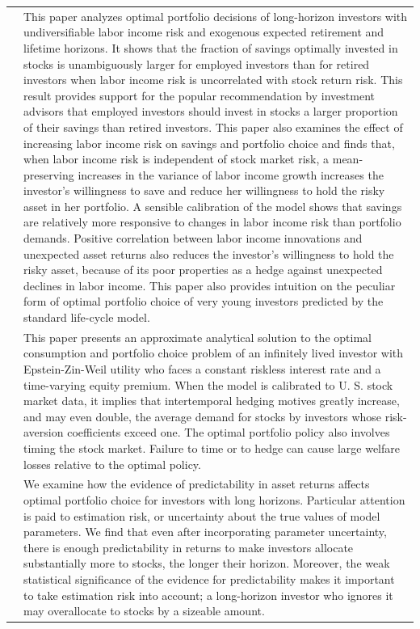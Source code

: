 \documentclass{article}
\begin{document}
\begin{tabular}{p{}p{}}
\cite{Viceira_2001} & This paper analyzes optimal portfolio decisions of long-horizon investors with undiversifiable labor income risk and exogenous expected retirement and lifetime horizons. It shows that the fraction of savings optimally invested in stocks is unambiguously larger for employed investors than for retired investors when labor income risk is uncorrelated with stock return risk. This result provides support for the popular recommendation by investment advisors that employed investors should invest in stocks a larger proportion of their savings than retired investors. This paper also examines the effect of increasing labor income risk on savings and portfolio choice and finds that, when labor income risk is independent of stock market risk, a mean-preserving increases in the variance of labor income growth increases the investor's willingness to save and reduce her willingness to hold the risky asset in her portfolio. A sensible calibration of the model shows that savings are relatively more responsive to changes in labor income risk than portfolio demands. Positive correlation between labor income innovations and unexpected asset returns also reduces the investor's willingness to hold the risky asset, because of its poor properties as a hedge against unexpected declines in labor income. This paper also provides intuition on the peculiar form of optimal portfolio choice of very young investors predicted by the standard life-cycle model. \\
\cite{Campbell_1999} & This paper presents an approximate analytical solution to the optimal consumption and portfolio choice problem of an infinitely lived investor with Epstein-Zin-Weil utility who faces a constant riskless interest rate and a time-varying equity premium. When the model is calibrated to U. S. stock market data, it implies that intertemporal hedging motives greatly increase, and may even double, the average demand for stocks by investors whose risk-aversion coefficients exceed one. The optimal portfolio policy also involves timing the stock market. Failure to time or to hedge can cause large welfare losses relative to the optimal policy. \\
\cite{Barberis_2000} & We examine how the evidence of predictability in asset returns affects optimal portfolio choice for investors with long horizons. Particular attention is paid to estimation risk, or uncertainty about the true values of model parameters. We find that even after incorporating parameter uncertainty, there is enough predictability in returns to make investors allocate substantially more to stocks, the longer their horizon. Moreover, the weak statistical significance of the evidence for predictability makes it important to take estimation risk into account; a long-horizon investor who ignores it may overallocate to stocks by a sizeable amount. \\

\end{tabular}
\end{document}
